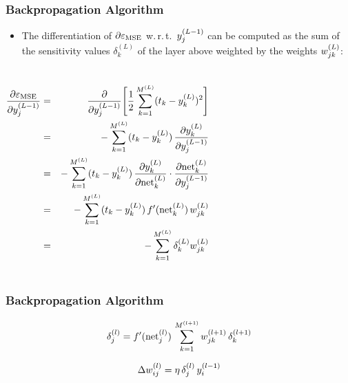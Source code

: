 \begin{frame}
  \frametitle{Backpropagation Algorithm \cont}
%
   \begin{itemize}
      \vspace*{-0.5cm}
     \item {\small The differentiation of $\partial \varepsilon_{\text{MSE}}$ w.\,r.\,t.\ $y_{j}^{(L-1)}$ can be computed as the sum of the sensitivity values $\delta_k^{(L)}$ of the layer above weighted by the weights $w_{jk}^{(L)}$:}
   \end{itemize}
  \begin{columns}
      \footnotesize
       \vspace*{-0.5cm}
      \begin{eqnarray*}
        \frac{\partial \varepsilon_{\text{MSE}}}{\partial y_{j}^{(L-1)}} & = &
        \frac{\partial}{\partial y_{j}^{(L-1)}} \Bigg[
          \frac{1}{2} \sum_{k=1}^{M^{(L)}} (t_k - y_{k}^{(L)})^2      
          \Bigg] \\ 
        & = & - \sum_{k=1}^{M^{(L)}} (t_k - y_{k}^{(L)}) \, \frac{\partial y_{k}^{(L)}}{\partial y_{j}^{(L-1)}} \\
        & = & - \sum_{k=1}^{M^{(L)}} (t_k - y_{k}^{(L)}) \, \frac{\partial y_{k}^{(L)}}{\partial\text{net}_{k}^{(L)}} \cdot
                \frac{\partial\text{net}_{k}^{(L)}}{\partial y_{j}^{(L-1)}} \nonumber \\
        & = & - \sum_{k=1}^{M^{(L)}} (t_k - y_{k}^{(L)}) \, f'(\text{net}_{k}^{(L)}) \, w_{jk}^{(L)} \\
        & = & - \sum_{k=1}^{M^{(L)}} \delta_k^{(L)} w_{jk}^{(L)}
      \end{eqnarray*}
      \begin{center}
        \resizebox{.8\linewidth}{!}{
          
        }
      \end{center}
  \end{columns}
\end{frame}


\begin{frame}
  \frametitle{Backpropagation Algorithm \cont}


  \begin{displaymath}
    \delta_j^{(l)} = f'(\text{net}_{j}^{(l)}) \, \sum_{k=1}^{M^{(l+1)}} w_{jk}^{(l+1)} \, \delta_k^{(l+1)}
  \end{displaymath}
  \pspread


  \begin{displaymath}
    \Delta w_{ij}^{(l)} = \eta \, \delta_j^{(l)} \, y_{i}^{(l-1)}
  \end{displaymath} 
\end{frame}

